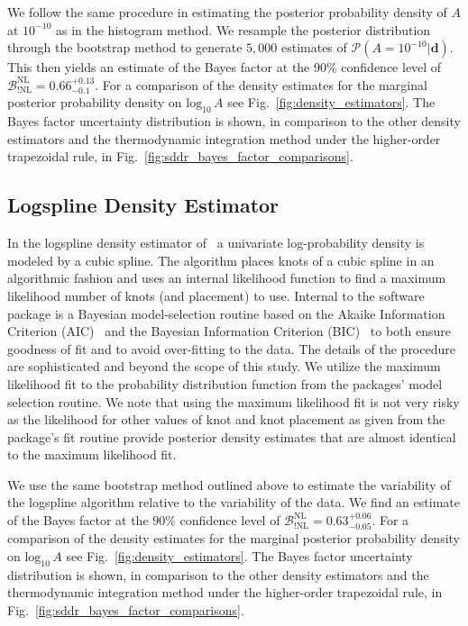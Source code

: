 We follow the same procedure in estimating the posterior probability density of $A$ at $10^{-10}$ as in the histogram method. We resample the posterior distribution through the bootstrap method to generate $5,000$ estimates of $\mathcal{P}(A =10^{-10}|\mathbf{d})$. This then yields an estimate of the Bayes factor at the $90\%$ confidence level of $\mathcal{B}^{\mathrm{NL}}_{!\mathrm{NL}} = 0.66^{+0.13}_{-0.1}$. For a comparison of the density estimates for the marginal posterior probability density on $\mathrm{log}_{10} \, A$ see Fig.~\ref{fig:density_estimators}. The Bayes factor uncertainty distribution is shown, in comparison to the other density estimators and the thermodynamic integration method under the higher-order trapezoidal rule, in Fig.~\ref{fig:sddr_bayes_factor_comparisons}.

\subsection{Logspline Density Estimator}
In the logspline density estimator of~\cite{stone1997polynomial} a univariate log-probability density is modeled by a cubic spline. The algorithm places knots of a cubic spline in an algorithmic fashion and uses an internal likelihood function to find a maximum likelihood number of knots (and placement) to use. Internal to the software package is a Bayesian model-selection routine based on the Akaike Information Criterion (AIC)~\citep{akaike1981likelihood} and the Bayesian Information Criterion (BIC)~\citep{schwarz1978estimating} to both ensure goodness of fit and to avoid over-fitting to the data. The details of the procedure are sophisticated and beyond the scope of this study. We utilize the maximum likelihood fit to the probability distribution function from the packages' model selection routine. We note that using the maximum likelihood fit is not very risky as the likelihood for other values of knot and knot placement as given from the package's fit routine provide posterior density estimates that are almost identical to the maximum likelihood fit.

We use the same bootstrap method outlined above to estimate the variability of the logspline algorithm relative to the variability of the data. We find an estimate of the Bayes factor at the $90\%$ confidence level of $\mathcal{B}^{\mathrm{NL}}_{!\mathrm{NL}} = 0.63^{+0.06}_{-0.05}$. For a comparison of the density estimates for the marginal posterior probability density on $\mathrm{log}_{10} \, A$ see Fig.~\ref{fig:density_estimators}. The Bayes factor uncertainty distribution is shown, in comparison to the other density estimators and the thermodynamic integration method under the higher-order trapezoidal rule, in Fig.~\ref{fig:sddr_bayes_factor_comparisons}.

